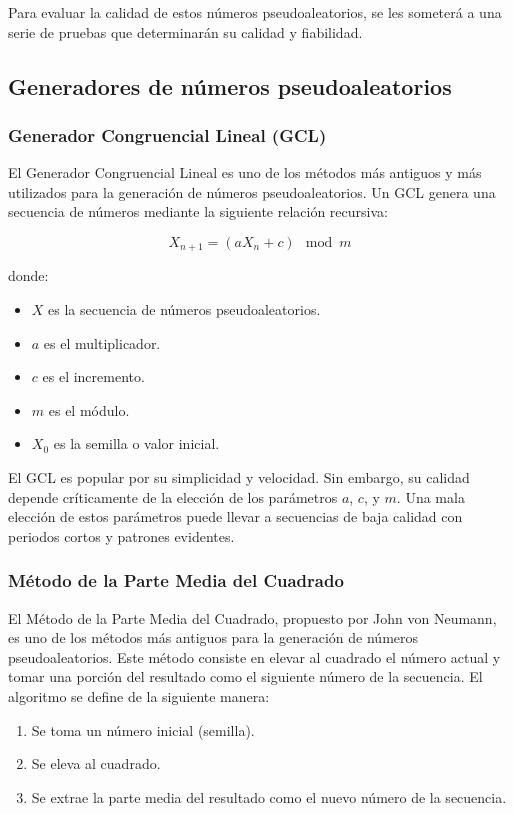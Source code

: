 \documentclass{article}
\begin{document}
Para evaluar la calidad de estos números pseudoaleatorios, se les someterá a una serie de pruebas que determinarán su calidad y fiabilidad.


\subsection{Generadores de números pseudoaleatorios}

\subsubsection{Generador Congruencial Lineal (GCL)}

El Generador Congruencial Lineal es uno de los métodos más antiguos y más utilizados para la generación de números pseudoaleatorios. Un GCL genera una secuencia de números mediante la siguiente relación recursiva:

\begin{equation}
 X_{n+1} = (aX_{n}+c) \mod m 
\end{equation}

donde:
\begin{itemize}
    \item $X$ es la secuencia de números pseudoaleatorios.
    \item $a$ es el multiplicador.
    \item $c$ es el incremento.
    \item $m$ es el módulo.
    \item $X_{0}$ es la semilla o valor inicial.
    
\end{itemize}
El GCL es popular por su simplicidad y velocidad. Sin embargo, su calidad depende críticamente de la elección de los parámetros $a$, $c$, y $m$. Una mala elección de estos parámetros puede llevar a secuencias de baja calidad con periodos cortos y patrones evidentes.

\subsubsection{Método de la Parte Media del Cuadrado}
El Método de la Parte Media del Cuadrado, propuesto por John von Neumann, es uno de los métodos más antiguos para la generación de números pseudoaleatorios. Este método consiste en elevar al cuadrado el número actual y tomar una porción del resultado como el siguiente número de la secuencia. El algoritmo se define de la siguiente manera:
\begin{enumerate}
    \item Se toma un número inicial (semilla).
    \item Se eleva al cuadrado.
    \item Se extrae la parte media del resultado como el nuevo número de la secuencia.
\end{enumerate}
\end{document}
